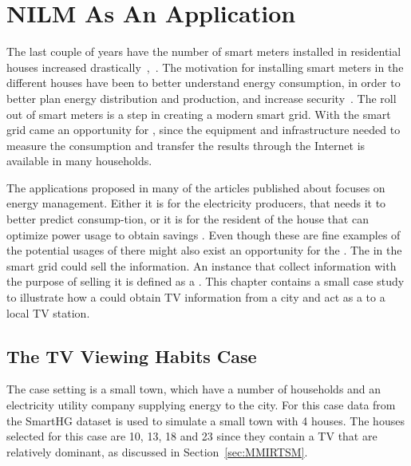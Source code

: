 \chapter{NILM As An Application} 
\label{sec:CaseStudy}
The last couple of years have the number of smart meters installed in residential houses increased drastically~\citep{RefWorks:44},~\citep{RefWorks:45}. The motivation for installing smart meters in the different houses have been to better understand energy consumption, in order to better plan energy distribution and production, and increase security~\citep{RefWorks:43}. The roll out of smart meters is a step in creating a modern smart grid. With the smart grid came an opportunity for , since the equipment and infrastructure needed to measure the consumption and transfer the results through the Internet is available in many households. 

The applications proposed in many of the articles published about  focuses on energy management. Either it is for the electricity producers, that needs it to better predict consump-tion, or it is for the resident of the house that can optimize power usage to obtain savings \citep{RefWorks:17}. Even though these are fine examples of the potential usages of  there might also exist an opportunity for the . The  in the smart grid could sell the  information. An instance that collect information with the purpose of selling it is defined as a . This chapter contains a small case study to illustrate how a  could obtain TV information from a city and act as a  to a local TV station. 

\section{The TV Viewing Habits Case}
The case setting is a small town, which have a number of households and an electricity utility company supplying energy to the city. For this case data from the SmartHG dataset is used to simulate a small town with 4 houses. The houses selected for this case are 10, 13, 18 and 23  since they contain a TV that are relatively dominant, as discussed in Section~\ref{sec:MMIRTSM}. 

